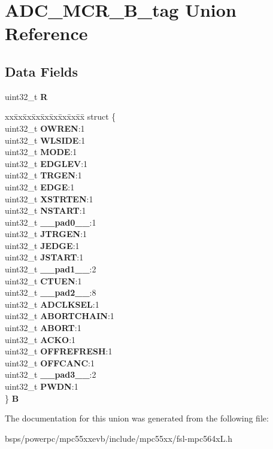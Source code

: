 \hypertarget{unionADC__MCR__32B__tag}{}\section{A\+D\+C\+\_\+\+M\+C\+R\+\_\+B\+\_\+tag Union Reference}
\label{unionADC__MCR__32B__tag}
\subsection*{Data Fields}
\begin{DoxyCompactItemize}
\item 
\mbox{\label{unionADC__MCR__32B__tag_a61d583f568f86a0ddcd1df303435a2de}} 
uint32\+\_\+t {\bfseries R}
\item 
\mbox{\label{unionADC__MCR__32B__tag_a5535f602f32c18dab55c959cbc33ef4b}} 
\begin{tabbing}
xx\=xx\=xx\=xx\=xx\=xx\=xx\=xx\=xx\=\kill
struct \{\\
\>uint32\_t {\bfseries OWREN}:1\\
\>uint32\_t {\bfseries WLSIDE}:1\\
\>uint32\_t {\bfseries MODE}:1\\
\>uint32\_t {\bfseries EDGLEV}:1\\
\>uint32\_t {\bfseries TRGEN}:1\\
\>uint32\_t {\bfseries EDGE}:1\\
\>uint32\_t {\bfseries XSTRTEN}:1\\
\>uint32\_t {\bfseries NSTART}:1\\
\>uint32\_t {\bfseries \_\_pad0\_\_}:1\\
\>uint32\_t {\bfseries JTRGEN}:1\\
\>uint32\_t {\bfseries JEDGE}:1\\
\>uint32\_t {\bfseries JSTART}:1\\
\>uint32\_t {\bfseries \_\_pad1\_\_}:2\\
\>uint32\_t {\bfseries CTUEN}:1\\
\>uint32\_t {\bfseries \_\_pad2\_\_}:8\\
\>uint32\_t {\bfseries ADCLKSEL}:1\\
\>uint32\_t {\bfseries ABORTCHAIN}:1\\
\>uint32\_t {\bfseries ABORT}:1\\
\>uint32\_t {\bfseries ACKO}:1\\
\>uint32\_t {\bfseries OFFREFRESH}:1\\
\>uint32\_t {\bfseries OFFCANC}:1\\
\>uint32\_t {\bfseries \_\_pad3\_\_}:2\\
\>uint32\_t {\bfseries PWDN}:1\\
\} {\bfseries B}\\

\end{tabbing}\end{DoxyCompactItemize}


The documentation for this union was generated from the following file\+:\begin{DoxyCompactItemize}
\item 
bsps/powerpc/mpc55xxevb/include/mpc55xx/fsl-\/mpc564x\+L.\+h\end{DoxyCompactItemize}
